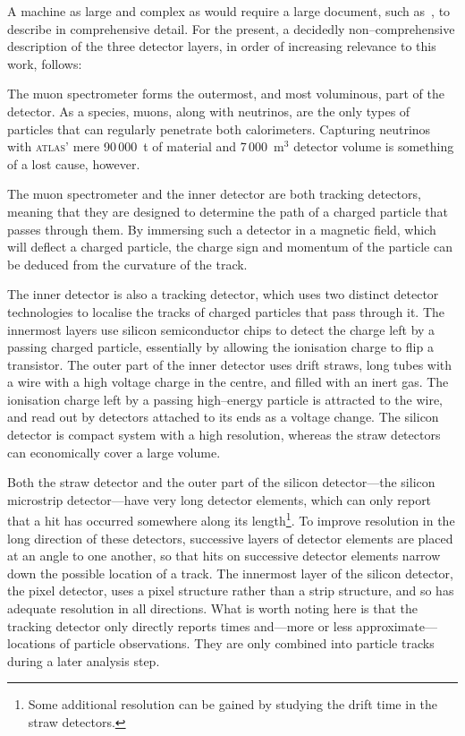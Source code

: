 A machine as large and complex as \atlas{} would require a large document, such as~\cite{detectorpaper}, to describe in comprehensive detail. For the present, a decidedly non--comprehensive description of the three detector layers, in order of increasing relevance to this work, follows:

The muon spectrometer forms the outermost, and most voluminous, part of the detector. As a species, muons, along with neutrinos, are the only types of particles that can regularly penetrate both calorimeters. Capturing neutrinos with \textsc{atlas}' mere 90\,000~t of material and 7\,000~m$^3$ detector volume \cite{atlasweb} is something of a lost cause, however.

The muon spectrometer and the inner detector are both tracking detectors, meaning that they are designed to determine the path of a charged particle that passes through them. By immersing such a detector in a magnetic field, which will deflect a charged particle, the charge sign and momentum of the particle can be deduced from the curvature of the track.

The inner detector is also a tracking detector, which uses two distinct detector technologies to localise the tracks of charged particles that pass through it. The innermost layers use silicon semiconductor chips to detect the charge left by a passing charged particle, essentially by allowing the ionisation charge to flip a transistor. The outer part of the inner detector uses drift straws, long tubes with a wire with a high voltage charge in the centre, and filled with an inert gas. The ionisation charge left by a passing high--energy particle is attracted to the wire, and read out by detectors attached to its ends as a voltage change. The silicon detector is compact system with a high resolution, whereas the straw detectors can economically cover a large volume.

Both the straw detector and the outer part of the silicon detector---the silicon microstrip detector---have very long detector elements, which can only report that a hit has occurred somewhere along its length\footnote{Some additional resolution can be gained by studying the drift time in the straw detectors.}. To improve resolution in the long direction of these detectors, successive layers of detector elements are placed at an angle to one another, so that hits on successive detector elements narrow down the possible location of a track. The innermost layer of the silicon detector, the pixel detector, uses a pixel structure rather than a strip structure, and so has adequate resolution in all directions. What is worth noting here is that the tracking detector only directly reports times and---more or less approximate---locations of particle observations. They are only combined into particle tracks during a later analysis step. 

